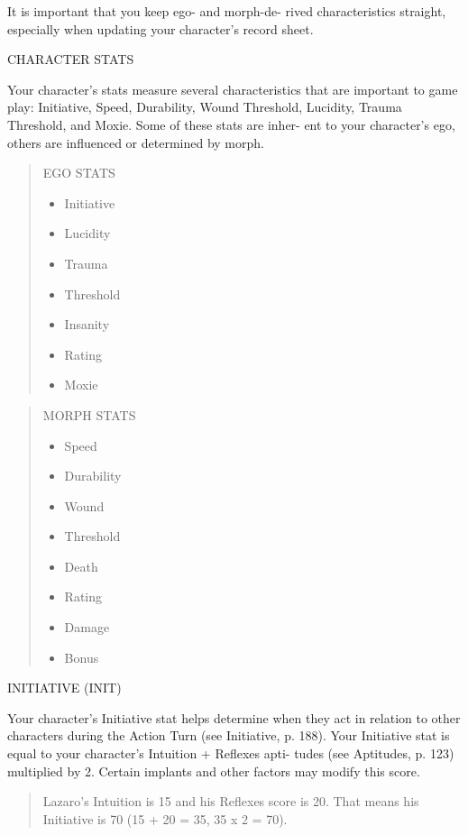 It is important that you keep ego- and morph-de-
rived characteristics straight, especially when updating
your character's record sheet.

CHARACTER STATS

Your character's stats measure several characteristics
that are important to game play: Initiative, Speed,
Durability, Wound Threshold, Lucidity, Trauma
Threshold, and Moxie. Some of these stats are inher-
ent to your character's ego, others are influenced or
determined by morph.

\begin{quotation}
  EGO STATS 
  \begin{itemize}
  \item Initiative
  \item Lucidity
  \item Trauma
  \item Threshold
  \item Insanity
  \item Rating
  \item Moxie
  \end{itemize}
\end{quotation}

\begin{quotation}
  MORPH STATS
  \begin{itemize}
  \item Speed
  \item Durability
  \item Wound
  \item Threshold
  \item Death
  \item Rating
  \item Damage
  \item Bonus
  \end{itemize}
\end{quotation}

INITIATIVE (INIT)

Your character's Initiative stat helps determine when
they act in relation to other characters during the
Action Turn (see Initiative, p. 188). Your Initiative stat
is equal to your character's Intuition + Reflexes apti-
tudes (see Aptitudes, p. 123) multiplied by 2. Certain
implants and other factors may modify this score.

\begin{quotation}
  Lazaro's Intuition is 15 and his Reflexes score is 20. That means
  his Initiative is 70 (15 + 20 = 35, 35 x 2 = 70).
\end{quotation}

